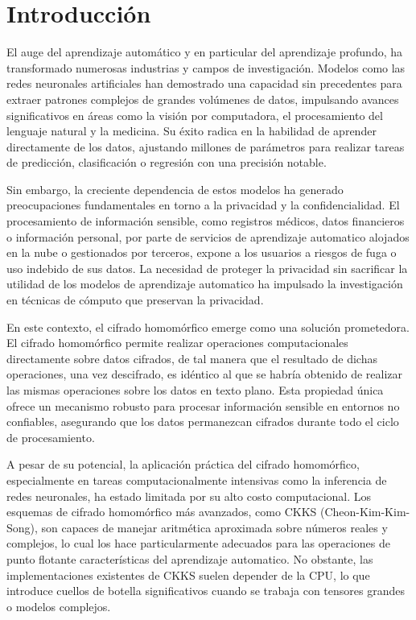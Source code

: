 \chapter*{Introducción}

El auge del aprendizaje automático y en particular del aprendizaje profundo, ha transformado numerosas industrias y campos de investigación. Modelos como las redes neuronales artificiales han demostrado una capacidad sin precedentes para extraer patrones complejos de grandes volúmenes de datos, impulsando avances significativos en áreas como la visión por computadora, el procesamiento del lenguaje natural y la medicina. Su éxito radica en la habilidad de aprender directamente de los datos, ajustando millones de parámetros para realizar tareas de predicción, clasificación o regresión con una precisión notable.

Sin embargo, la creciente dependencia de estos modelos ha generado preocupaciones fundamentales en torno a la privacidad y la confidencialidad. El procesamiento de información sensible, como registros médicos, datos financieros o información personal, por parte de servicios de aprendizaje automatico alojados en la nube o gestionados por terceros, expone a los usuarios a riesgos de fuga o uso indebido de sus datos. La necesidad de proteger la privacidad sin sacrificar la utilidad de los modelos de aprendizaje automatico ha impulsado la investigación en técnicas de cómputo que preservan la privacidad.

En este contexto, el cifrado homomórfico emerge como una solución prometedora. El cifrado homomórfico permite realizar operaciones computacionales directamente sobre datos cifrados, de tal manera que el resultado de dichas operaciones, una vez descifrado, es idéntico al que se habría obtenido de realizar las mismas operaciones sobre los datos en texto plano. Esta propiedad única ofrece un mecanismo robusto para procesar información sensible en entornos no confiables, asegurando que los datos permanezcan cifrados durante todo el ciclo de procesamiento.

A pesar de su potencial, la aplicación práctica del cifrado homomórfico, especialmente en tareas computacionalmente intensivas como la inferencia de redes neuronales, ha estado limitada por su alto costo computacional. Los esquemas de cifrado homomórfico más avanzados, como CKKS (Cheon-Kim-Kim-Song), son capaces de manejar aritmética aproximada sobre números reales y complejos, lo cual los hace particularmente adecuados para las operaciones de punto flotante características del aprendizaje automatico. No obstante, las implementaciones existentes de CKKS suelen depender de la CPU, lo que introduce cuellos de botella significativos cuando se trabaja con tensores grandes o modelos complejos.

